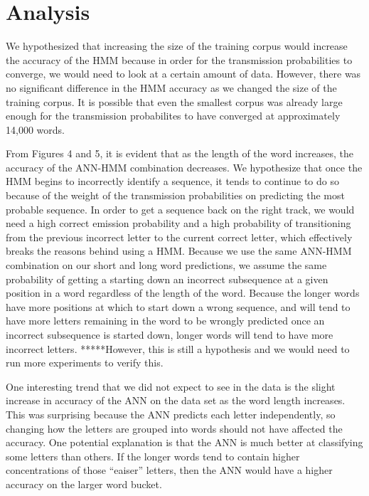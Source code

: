 \documentclass[11pt,a4paper,twocolumn]{article}
\begin{document}
\section{Analysis}

We hypothesized that increasing the size of the training corpus would increase the accuracy of the HMM because in order for the transmission probabilities to converge, we would need to look at a certain amount of data. However, there was no significant difference in the HMM accuracy as we changed the size of the training corpus. It is possible that even the smallest corpus was already large enough for the transmission probabilites to have converged at approximately 14,000 words.

From Figures 4 and 5, it is evident that as the length of the word increases, the accuracy of the ANN-HMM combination decreases. We hypothesize that once the HMM begins to incorrectly identify a sequence, it tends to continue to do so because of the weight of the transmission probabilities on predicting the most probable sequence. In order to get a sequence back on the right track, we would need a high correct emission probability and a high probability of transitioning from the previous incorrect letter to the current correct letter, which effectively breaks the reasons behind using a HMM. Because we use the same ANN-HMM combination on our short and long word predictions, we assume the same probability of getting a starting down an incorrect subsequence at a given position in a word regardless of the length of the word. Because the longer words have more positions at which to start down a wrong sequence, and will tend to have more letters remaining in the word to be wrongly predicted once an incorrect subsequence is started down, longer words will tend to have more incorrect letters. *****However, this is still a hypothesis and we would need to run more experiments to verify this.

One interesting trend that we did not expect to see in the data is the slight increase in accuracy of the ANN on the data set as the word length increases. This was surprising because the ANN predicts each letter independently, so changing how the letters are grouped into words should not have affected the accuracy. One potential explanation is that the ANN is much better at classifying some letters than others. If the longer words tend to contain higher concentrations of those ``eaiser'' letters, then the ANN would have a higher accuracy on the larger word bucket. 
\end{document}
